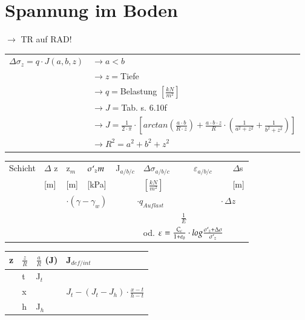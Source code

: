 \section{Spannung im Boden}
	\begin{minipage}{\linewidth}
		$\rightarrow$ TR auf RAD!
		
		\begin{tabular}{ll}
		$\Delta \sigma_z=q \cdot J(a,b,z)$	& $\rightarrow a<b$ \\
											& $\rightarrow z=$Tiefe \\
											& $\rightarrow q=$Belastung $\left[\frac{kN}{m^2}\right]$ \\
											& $\rightarrow J=$Tab. s. 6.10f \\
											& $\rightarrow J=\frac{1}{2\cdot \pi} \cdot \left[arctan(\frac{a \cdot b}{R \cdot z}) + \frac{a \cdot b \cdot z}{R} \cdot  \left(\frac{1}{a^2 + z^2} + \frac{1}{b^2 + z^2}\right) \right]$ \\
											& $\rightarrow R^2=a^2 + b^2 + z^2$ \\	
		\end{tabular}

 	\vspace{\baselineskip}
 		\end{minipage}
 	

\begin{minipage}{0.7\linewidth}
	\begin{tabular}{|l|l|l|l|l|l|l|l|}
		\hline
		Schicht	& $\Delta$ z	& z$_m$		& $\sigma`_zm$	& J$_{a/b/c}$	& $\Delta \sigma_{a/b/c}$ 	& $\varepsilon_{a/b/c}$ 	& $\Delta$s \\
		& [m]			& [m]		&  [kPa]		& 				& $\left[\frac{kN}{m^2}\right]$ &		& [m] \\ \hline
		
		&		& \multicolumn{2}{c|}{$\cdot (\gamma - \gamma_w)$} &		\multicolumn{2}{c|}{$\cdot q_{Auflast}$} & \multicolumn{2}{c|}{$\qquad \cdot \Delta z$} \\
		&	&	&	&	& \multicolumn{2}{c|}{$\frac{1}{E}$} & \\
		&	&	&	&	&\multicolumn{2}{c|}{ od. $\varepsilon=\frac{C_c}{1 + e_0} \cdot log \frac{\sigma`_z + \Delta \sigma}{\sigma`_z}$} & \\ \hline 	
	\end{tabular}
	\vspace{\baselineskip}
\end{minipage}	
\begin{minipage}{0.4\linewidth}
		\begin{tabular}{l|l|l|l}
			\hline
			z	&	$\frac{z}{R}$	&	$\frac{a}{R}$ (J)	&	J$_{def/int}$	\\ \hline
				& \qquad	t		&	J$_t$				&	\\
				&	x				&						& $J_t - (J_t - J_h) \cdot \frac{x - t}{h - t}$	\\
				& \qquad	h		&	J$_h$				&	\\
		\end{tabular}
		\vspace{\baselineskip} \\
\end{minipage}



